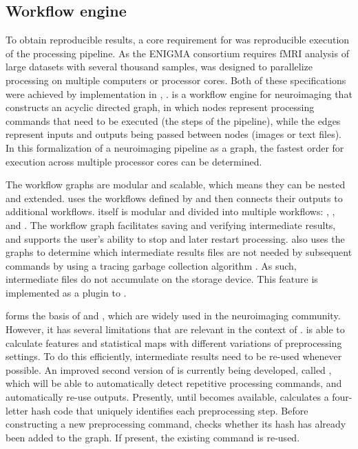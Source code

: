 \subsection{Workflow engine}

To obtain reproducible results, a core requirement for  was
reproducible execution of the processing pipeline. As the ENIGMA consortium
requires fMRI analysis of large datasets with several thousand samples,
 was designed to parallelize processing on multiple
computers or processor cores. Both of these specifications were achieved by
implementation in ,  \parencite{10.3389/fninf.2011.00013}.  is a
workflow engine for neuroimaging that constructs an acyclic directed graph,
in which nodes represent processing commands that need to be executed (the
steps of the pipeline), while the edges represent inputs and outputs being
passed between nodes (images or text files). In this formalization of a
neuroimaging pipeline as a graph, the fastest order for execution across
multiple processor cores can be determined.

The workflow graphs are modular and scalable, which means they can be
nested and extended.  uses the workflows defined by
 and then connects their outputs to additional workflows.
 itself is modular and divided into multiple workflows:
 \parencite{esteban_oscar_2021_4593442}, , and
. The workflow graph facilitates saving and verifying
intermediate results, and supports the user's ability to stop and later
restart processing.  also uses the graphs to determine which
intermediate results files are not needed by subsequent commands by using a
tracing garbage collection algorithm \parencite{10.1145/359642.359655}. As
such, intermediate files do not accumulate on the storage device. This
feature is implemented as a plugin to .

 forms the basis of  and , which
are widely used in the neuroimaging community. However, it has several
limitations that are relevant in the context of .
 is able to calculate features and statistical maps with
different variations of preprocessing settings. To do this efficiently,
intermediate results need to be re-used whenever possible. An improved
second version of  is currently being developed, called
 \parencite{pydra-proc-scipy-2020}, which will be able to
automatically detect repetitive processing commands, and automatically
re-use outputs. Presently, until  becomes available,
 calculates a four-letter hash code that uniquely identifies
each preprocessing step. Before constructing a new preprocessing command,
 checks whether its hash has already been added to the
graph. If present, the existing command is re-used.

